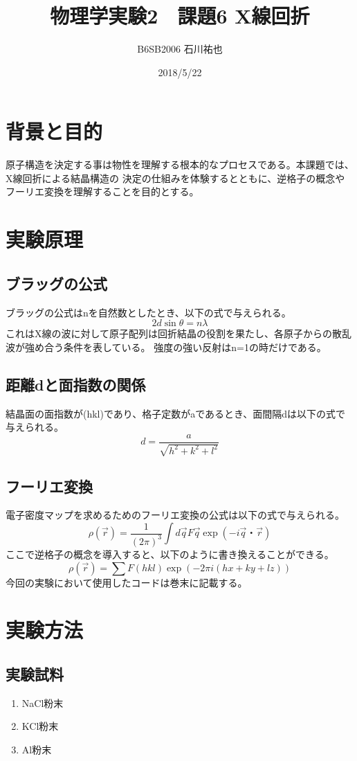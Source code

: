 \documentclass[a4paper,12pt]{jarticle}
\title{物理学実験2　課題6 X線回折}
\author{B6SB2006  石川祐也}
\date{2018/5/22}
\begin{document}
\section{背景と目的}
 原子構造を決定する事は物性を理解する根本的なプロセスである。本課題では、X線回折による結晶構造の
 決定の仕組みを体験するとともに、逆格子の概念やフーリエ変換を理解することを目的とする。

\section{実験原理}
 \subsection{ブラッグの公式}
  ブラッグの公式はnを自然数としたとき、以下の式で与えられる。
  $$2d \sin \theta = n \lambda$$
  これはX線の波に対して原子配列は回折結晶の役割を果たし、各原子からの散乱波が強め合う条件を表している。
  強度の強い反射はn=1の時だけである。
  

 \subsection{距離dと面指数の関係}
  結晶面の面指数が(hkl)であり、格子定数がaであるとき、面間隔dは以下の式で与えられる。
  $$d = \frac{a}{\sqrt{h^2 + k^2 + l^2}}$$

 \subsection{フーリエ変換}
  電子密度マップを求めるためのフーリエ変換の公式は以下の式で与えられる。
  $$\rho(\vec{r})=\frac{1}{(2 \pi)^3}\int d\vec{q} F{\vec{q}} \exp(-i\vec{q}・\vec{r})$$
  ここで逆格子の概念を導入すると、以下のように書き換えることができる。
  $$\rho(\vec{r})=\sum F(hkl) \exp{(-2\pi i(hx+ky+lz))}$$
  今回の実験において使用したコードは巻末に記載する。
  

\section{実験方法}
 \subsection{実験試料}

  \begin{enumerate}
   \item NaCl粉末
   \item KCl粉末
   \item Al粉末
  \end{enumerate}
\end{document}
